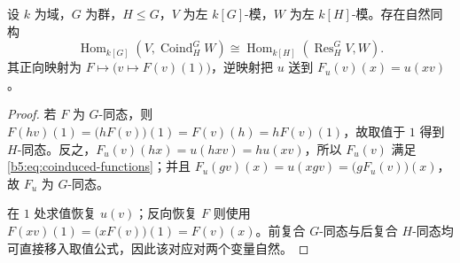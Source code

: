 \begin{proposition}\label{b5:prop:coinduction-adjunction}
	设 \(k\) 为域，\(G\) 为群，\(H\le G\)，\(V\) 为左 \(k[G]\)-模，\(W\) 为左 \(k[H]\)-模。存在自然同构
	\[
		\operatorname{Hom}_{k[G]}(V,\operatorname{Coind}_H^G W) \cong\operatorname{Hom}_{k[H]}(\operatorname{Res}_H^G V,W).
	\]
	其正向映射为 \(F\mapsto\bigl(v\mapsto F(v)(1)\bigr)\)，逆映射把 \(u\) 送到 \(F_u(v)(x)=u(xv)\)。
\end{proposition}
\begin{proof}
	若 \(F\) 为 \(G\)-同态，则 \(F(hv)(1)=\bigl(hF(v)\bigr)(1)=F(v)(h)=hF(v)(1)\)，故取值于 \(1\) 得到 \(H\)-同态。反之，\(F_u(v)(hx)=u(hxv)=hu(xv)\)，所以 \(F_u(v)\) 满足\eqref{b5:eq:coinduced-functions}；并且 \(F_u(gv)(x)=u(xgv)=\bigl(gF_u(v)\bigr)(x)\)，故 \(F_u\) 为 \(G\)-同态。

	在 \(1\) 处求值恢复 \(u(v)\)；反向恢复 \(F\) 则使用 \(F(xv)(1)=\bigl(xF(v)\bigr)(1)=F(v)(x)\)。前复合 \(G\)-同态与后复合 \(H\)-同态均可直接移入取值公式，因此该对应对两个变量自然。
\end{proof}

